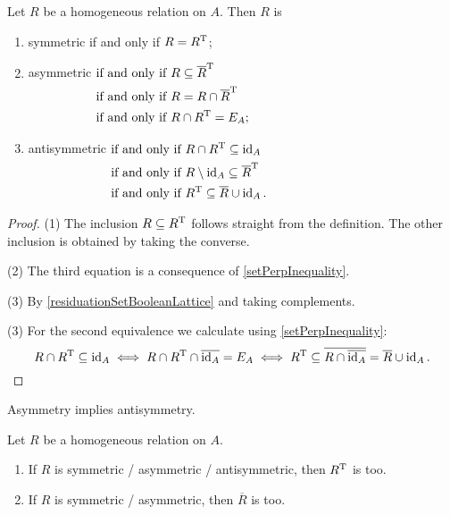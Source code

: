 \begin{lemma} \label{relationalSymmetryEquivalents}
Let $R$ be a homogeneous relation on $A$. Then $R$ is
\begin{enumerate}
\item symmetric \textup{if and only if} $R = R^{\mathrm{T}}$;
\item asymmetric $\begin{aligned}[t]
&\text{\textup{if and only if}}\; R \subseteq \overline{R}^{\mathrm{T}} \\
&\text{\textup{if and only if}}\; R = R \cap \overline{R}^{\mathrm{T}} \\
&\text{\textup{if and only if}}\; R \cap R^{\mathrm{T}} = E_A;
\end{aligned}$
\item antisymmetric $\begin{aligned}[t]
&\text{\textup{if and only if}}\; R\cap R^{\mathrm{T}} \subseteq \operatorname{id}_A \\
&\text{\textup{if and only if}}\; R\setminus \operatorname{id}_A \subseteq  \overline{R}^{\mathrm{T}} \\
&\text{\textup{if and only if}}\; R^{\mathrm{T}}\subseteq \overline{R}\cup \operatorname{id}_A.
\end{aligned}$
\end{enumerate}
\end{lemma}
\begin{proof}
(1) The inclusion $R\subseteq R^{\mathrm{T}}$ follows straight from the definition. The other inclusion is obtained by taking the converse.

(2) The third equation is a consequence of \ref{setPerpInequality}.

(3) By \ref{residuationSetBooleanLattice} and taking complements.

(3) For the second equivalence we calculate using \ref{setPerpInequality}:
\[ R\cap R^{\mathrm{T}} \subseteq \operatorname{id}_A \iff R\cap R^{\mathrm{T}} \cap\overline{\operatorname{id}_A} = E_A \iff R^{\mathrm{T}} \subseteq \overline{R \cap \overline{\operatorname{id}_A}} = \overline{R} \cup \operatorname{id}_A. \]
\end{proof}
\begin{corollary} \label{asymmetryAntisymmetry}
Asymmetry implies antisymmetry.
\end{corollary}

\begin{lemma}
Let $R$ be a homogeneous relation on $A$.
\begin{enumerate}
\item If $R$ is symmetric / asymmetric / antisymmetric, then $R^{\mathrm{T}}$ is too.
\item If $R$ is symmetric / asymmetric, then $\overline{R}$ is too.
\end{enumerate}
\end{lemma}

